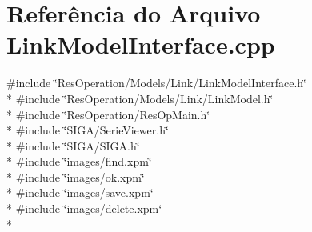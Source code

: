 \section{Referência do Arquivo Link\+Model\+Interface.\+cpp}
\label{_link_model_interface_8cpp}
{\ttfamily \#include \char`\"{}Res\+Operation/\+Models/\+Link/\+Link\+Model\+Interface.\+h\char`\"{}}\\*
{\ttfamily \#include \char`\"{}Res\+Operation/\+Models/\+Link/\+Link\+Model.\+h\char`\"{}}\\*
{\ttfamily \#include \char`\"{}Res\+Operation/\+Res\+Op\+Main.\+h\char`\"{}}\\*
{\ttfamily \#include \char`\"{}S\+I\+G\+A/\+Serie\+Viewer.\+h\char`\"{}}\\*
{\ttfamily \#include \char`\"{}S\+I\+G\+A/\+S\+I\+G\+A.\+h\char`\"{}}\\*
{\ttfamily \#include \char`\"{}images/find.\+xpm\char`\"{}}\\*
{\ttfamily \#include \char`\"{}images/ok.\+xpm\char`\"{}}\\*
{\ttfamily \#include \char`\"{}images/save.\+xpm\char`\"{}}\\*
{\ttfamily \#include \char`\"{}images/delete.\+xpm\char`\"{}}\\*
